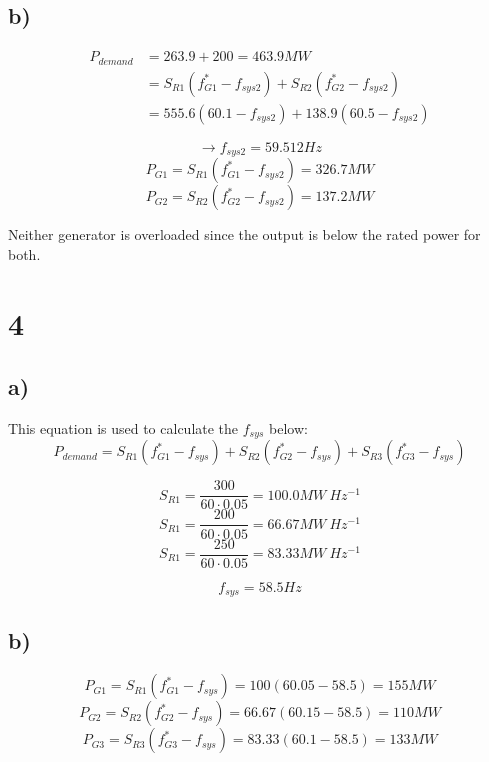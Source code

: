 \documentclass[fleqn, twocolumn]{article}
\begin{document}
\subsection*{b)}
\label{sec:org4c22f85}
\begin{align*}
  P_{demand} &= 263.9+200 = 463.9\si{MW} \\
  &= S_{R1}(f_{G1}^* - f_{sys2}) + S_{R2}(f_{G2}^* - f_{sys2}) \\
  &= 555.6(60.1 - f_{sys2}) + 138.9(60.5 - f_{sys2})
\end{align*}

\[\to f_{sys2} = \boxed{59.512\si{Hz}}\]
\[P_{G1} = S_{R1}(f_{G1}^* - f_{sys2}) = \boxed{326.7\si{MW}}\]
\[P_{G2} = S_{R2}(f_{G2}^* - f_{sys2}) = \boxed{137.2\si{MW}}\]

Neither generator is overloaded since the output is below the rated
power for both.

\section*{4}
\label{sec:org6781559}
\subsection*{a)}
\label{sec:org24cf07b}
This equation is used to calculate the \(f_{sys}\) below:
\[P_{demand} = S_{R1}(f_{G1}^* - f_{sys})
+ S_{R2}(f_{G2}^* - f_{sys})
+ S_{R3}(f_{G3}^* - f_{sys})\]

\[S_{R1} = \frac{300}{60\cdot 0.05} = 100.0 \si{MW \ Hz^{-1}}\]
\[S_{R1} = \frac{200}{60\cdot 0.05} = 66.67 \si{MW \ Hz^{-1}}\]
\[S_{R1} = \frac{250}{60\cdot 0.05} = 83.33 \si{MW \ Hz^{-1}}\]

\[\boxed{f_{sys} = 58.5\si{Hz}}\]

\subsection*{b)}
\label{sec:orge8bce83}
\[P_{G1} = S_{R1}(f_{G1}^* - f_{sys}) = 100(60.05 - 58.5) = \boxed{155 \si{MW}}\]
\[P_{G2} = S_{R2}(f_{G2}^* - f_{sys}) = 66.67(60.15 - 58.5) = \boxed{110 \si{MW}}\]
\[P_{G3} = S_{R3}(f_{G3}^* - f_{sys}) = 83.33(60.1 - 58.5) = \boxed{133 \si{MW}}\]
\end{document}
